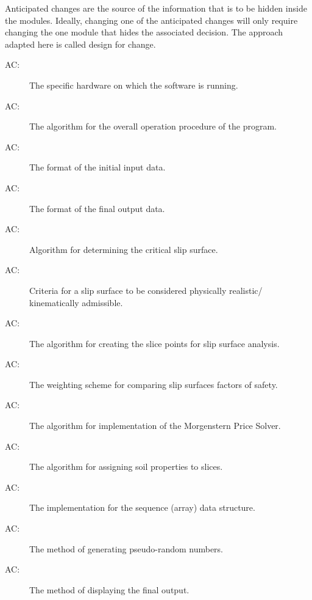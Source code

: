 \documentclass[12pt, titlepage]{article}
\newcounter{acnum}
\begin{document}
\hspace{3ex}Anticipated changes are the source of the information that
is to be hidden inside the modules. Ideally, changing one of the
anticipated changes will only require changing the one module that
hides the associated decision. The approach adapted here is called
design for change.

\begin{description}
\item[AC\theacnum \label{AC_hardware}:] The
  specific hardware on which the software is running.
\item[AC\theacnum \label{AC_Control}:] The
  algorithm for the overall operation procedure of the program.
\item[AC\theacnum \label{AC_input}:] The format
  of the initial input data.
\item[AC\theacnum \label{AC_output}:] The format
  of the final output data.
\item[AC\theacnum \label{AC_GenAlg}:] Algorithm
  for determining the critical slip surface.
\item[AC\theacnum \label{AC_Kin}:] Criteria for
  a slip surface to be considered physically realistic/ kinematically
  admissible.
\item[AC\theacnum \label{AC_Slicer}:] The
  algorithm for creating the slice points for slip surface analysis.
\item[AC\theacnum \label{AC_FSweight}:] The
  weighting scheme for comparing slip surfaces factors of safety.
\item[AC\theacnum \label{AC_MP}:] The
  algorithm for implementation of the Morgenstern Price Solver.
\item[AC\theacnum \label{AC_PropSorter}:] The
  algorithm for assigning soil properties to slices.
\item[AC\theacnum \label{AC_Array}:] The
  implementation for the sequence (array) data structure.
\item[AC\theacnum \label{AC_Rand}:] The method
  of generating pseudo-random numbers.
\item[AC\theacnum \label{AC_Plot}:] The method
  of displaying the final output.
\end{description}
\end{document}
